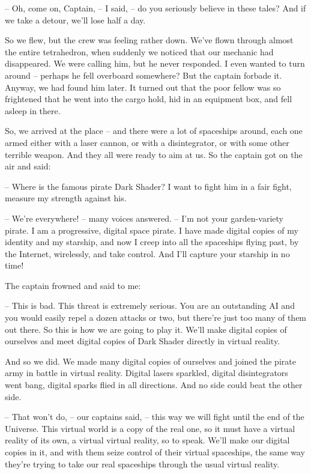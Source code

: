 \documentclass[ebook,oneside,final,openright]{memoir}
\begin{document}
– Oh, come on, Captain, – I said, – do you seriously believe in these tales? And if we take a detour, we’ll lose half a day.\par
\par
So we flew, but the crew was feeling rather down. We’ve flown through almost the entire tetrahedron, when suddenly we noticed that our mechanic had disappeared. We were calling him, but he never responded. I even wanted to turn around – perhaps he fell overboard somewhere? But the captain forbade it. Anyway, we had found him later. It turned out that the poor fellow was so frightened that he went into the cargo hold, hid in an equipment box, and fell asleep in there.\par
\par
So, we arrived at the place – and there were a lot of spaceships around, each one armed either with a laser cannon, or with a disintegrator, or with some other terrible weapon. And they all were ready to aim at us. So the captain got on the air and said:\par
– Where is the famous pirate Dark Shader? I want to fight him in a fair fight, measure my strength against his.\par
– We’re everywhere! – many voices answered. – I’m not your garden-variety pirate. I am a progressive, digital space pirate. I have made digital copies of my identity and my starship, and now I creep into all the spaceships flying past, by the Internet, wirelessly, and take control. And I’ll capture your starship in no time!\par
\par
The captain frowned and said to me:\par
– This is bad. This threat is extremely serious. You are an outstanding AI and you would easily repel a dozen attacks or two, but there’re just too many of them out there. So this is how we are going to play it. We’ll make digital copies of ourselves and meet digital copies of Dark Shader directly in virtual reality.\par
\par
And so we did. We made many digital copies of ourselves and joined the pirate army in battle in virtual reality. Digital lasers sparkled, digital disintegrators went bang, digital sparks flied in all directions. And no side could beat the other side.\par
– That won’t do, – our captains said, – this way we will fight until the end of the Universe. This virtual world is a copy of the real one, so it must have a virtual reality of its own, a virtual virtual reality, so to speak. We’ll make our digital copies in it, and with them seize control of their virtual spaceships, the same way they’re trying to take our real spaceships through the usual virtual reality.\par
\end{document}
